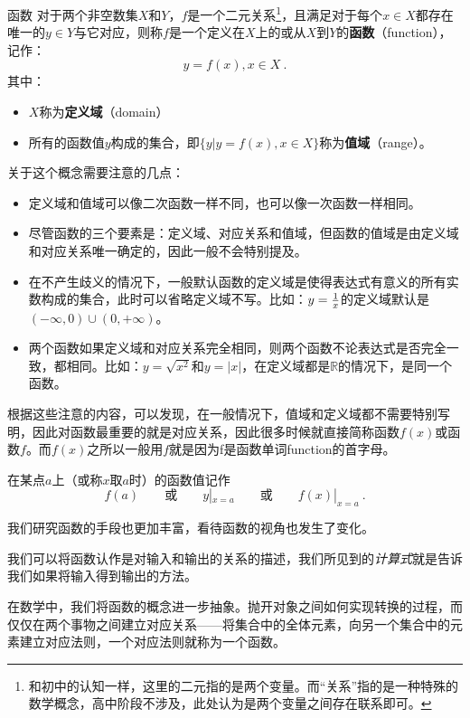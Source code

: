 \begin{definition}{函数}\label{def_functi_1}
对于两个非空数集$X$和$Y$，$f$是一个二元关系\footnote{和初中的认知一样，这里的二元指的是两个变量。而“关系”指的是一种特殊的数学概念，高中阶段不涉及，此处认为是两个变量之间存在联系即可。}，且满足对于每个$x\in X$都存在唯一的$y\in Y$与它对应，则称$f$是一个定义在$X$上的或从$X$到$Y$的\textbf{函数}（function），记作：
\begin{equation}
y=f(x),x\in X~.
\end{equation}
其中：
\begin{itemize}
\item $X$称为\textbf{定义域}（domain）
\item 所有的函数值$y$构成的集合，即$\{y|y=f(x),x\in X\}$称为\textbf{值域}（range）。
\end{itemize}
\end{definition}

关于这个概念需要注意的几点：
\begin{itemize}
\item 定义域和值域可以像二次函数一样不同，也可以像一次函数一样相同。
\item 尽管函数的三个要素是：定义域、对应关系和值域，但函数的值域是由定义域和对应关系唯一确定的，因此一般不会特别提及。
\item 在不产生歧义的情况下，一般默认函数的定义域是使得表达式有意义的所有实数构成的集合，此时可以省略定义域不写。比如：$y={1\over x}$的定义域默认是$(-\infty,0)\cup(0,+\infty)$。
\item 两个函数如果定义域和对应关系完全相同，则两个函数不论表达式是否完全一致，都相同。比如：$y=\sqrt{x^2}$和$y=|x|$，在定义域都是$\mathbb R$的情况下，是同一个函数。
\end{itemize}

根据这些注意的内容，可以发现，在一般情况下，值域和定义域都不需要特别写明，因此对函数最重要的就是对应关系，因此很多时候就直接简称函数$f(x)$或函数$f$。而$f(x)$之所以一般用$f$就是因为f是函数单词function的首字母。

在某点$a$上（或称$x$取$a$时）的函数值记作
\begin{equation}
f(a)\qquad\text{或}\qquad y|_{x=a}\qquad\text{或}\qquad f(x)|_{x=a}~.
\end{equation}

我们研究函数的手段也更加丰富，看待函数的视角也发生了变化。

我们可以将函数认作是对输入和输出的关系的描述，我们所见到的\textsl{计算式}就是告诉我们如果将输入得到输出的方法。

在数学中，我们将函数的概念进一步抽象。抛开对象之间如何实现转换的过程，而仅仅在两个事物之间建立对应关系——将集合中的全体元素，向另一个集合中的元素建立对应法则，一个对应法则就称为一个函数。

